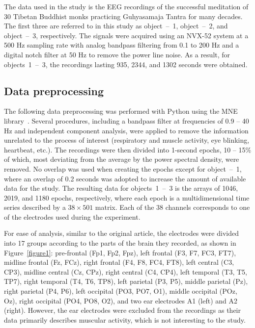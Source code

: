 \documentclass[shortAfour,times,sagev]{sagej}
\begin{document}
The data used in the study is the EEG recordings of the successful meditation of 30 Tibetan Buddhist monks practicing Guhyasamaja Tantra for many decades. The first three are referred to in this study as object~\mbox{--}~1, object~\mbox{--}~2, and object~\mbox{--}~3, respectively. The signals were acquired using an NVX-52 system at a 500 Hz sampling rate with analog bandpass filtering from 0.1 to 200 Hz and a digital notch filter at 50 Hz to remove the power line noise. As a result, for objects~1~\mbox{--}~3, the recordings lasting 935, 2344, and 1302 seconds were obtained.

\subsection{Data preprocessing}

The following data preprocessing was performed with Python using the MNE library~\cite{MNE}. Several procedures, including a bandpass filter at frequencies of 0.9 -- 40 Hz and independent component analysis, were applied to remove the information unrelated to the process of interest (respiratory and muscle activity, eye blinking, heartbeat, etc.). The recordings were then divided into 1-second epochs, 10 -- 15\% of which, most deviating from the average by the power spectral density, were removed. No overlap was used when creating the epochs except for object~\mbox{--}~1, where an overlap of 0.2 seconds was adopted to increase the amount of available data for the study. The resulting data for objects~1~\mbox{--}~3 is the arrays of 1046, 2019, and 1180 epochs, respectively, where each epoch is a multidimensional time series described by a $38\times501$ matrix. Each of the 38 channels corresponds to one of the electrodes used during the experiment.

For ease of analysis, similar to the original article, the electrodes were divided into 17 groups according to the parts of the brain they recorded, as shown in Figure~\ref{figure1}: pre-frontal (Fp1, Fp2, Fpz), left frontal (F3, F7, FC3, FT7), midline frontal (Fz, FCz), right frontal (F4, F8, FC4, FT8), left central (C3, CP3), midline central (Cz, CPz), right central (C4, CP4), left temporal (T3, T5, TP7), right temporal (T4, T6, TP8), left parietal (P3, P5), middle parietal (Pz), right parietal (P4, P6), left occipital (PO3, PO7, O1), middle occipital (POz, Oz), right occipital (PO4, PO8, O2), and two ear electrodes A1 (left) and A2 (right). However, the ear electrodes were excluded from the recordings as their data primarily describes muscular activity, which is not interesting to the study.
\end{document}
